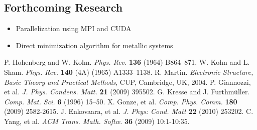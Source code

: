 \documentclass[a0,landscape]{a0poster}
\begin{document}
\begin{multicols}{3}
\color{DarkSlateGray} %

\section*{Forthcoming Research}

\begin{itemize}
\item Parallelization using MPI and CUDA
\item Direct minimization algorithm for metallic systems
\end{itemize}


\begin{thebibliography}{0}
 P. Hohenberg and W. Kohn. \textit{Phys. Rev.} \textbf{136}
 (1964) B864–871.
 W. Kohn and L. Sham. \textit{Phys. Rev.} \textbf{140} (4A) (1965) A1333–1138.
 R. Martin. \textit{Electronic Structure, Basic Theory and Practical Methods}, CUP, Cambridge, UK, 2004.
 P. Giannozzi, et al. \textit{J. Phys. Condens. Matt.}
\textbf{21} (2009) 395502.
 G. Kresse and J. Furthmüller. \textit{Comp. Mat. Sci.}
\textbf{6} (1996) 15–50.
 X. Gonze, et al. \textit{Comp. Phys. Comm.} \textbf{180}
(2009) 2582-2615.
 J. Enkovaara, et al. \textit{J. Phys: Cond. Matt}
\textbf{22} (2010) 253202.
 C. Yang, et al. \textit{ACM Trans. Math. Softw.}
\textbf{36} (2009) 10:1-10:35.
\end{thebibliography}






\end{multicols}
\end{document}
